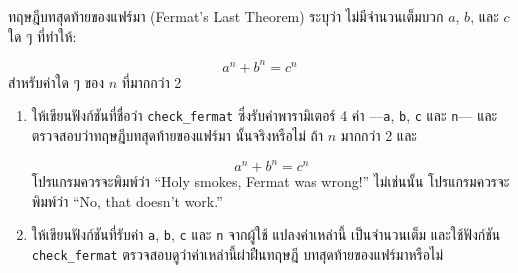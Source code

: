 \begin{exercise}

ทฤษฎีบทสุดท้ายของแฟร์มา (Fermat's Last Theorem) ระบุว่า ไม่มีจำนวนเต็มบวก
$a$, $b$, และ $c$ ใด ๆ ที่ทำให้: 

\[ a^n + b^n = c^n \]
%
สำหรับค่าใด ๆ ของ $n$ ที่มากกว่า 2

\begin{enumerate}

\item ให้เขียนฟังก์ชันที่ชื่อว่า \verb"check_fermat" ซึ่งรับค่าพารามิเตอร์ 4 ค่า
---{\tt a}, {\tt b}, {\tt c} และ {\tt n}--- และตรวจสอบว่าทฤษฎีบทสุดท้ายของแฟร์มา
นั้นจริงหรือไม่ ถ้า $n$ มากกว่า 2 และ

\[a^n + b^n = c^n \]
%
โปรแกรมควรจะพิมพ์ว่า ``Holy smokes, Fermat was wrong!''
ไม่เช่นนั้น โปรแกรมควรจะพิมพ์ว่า ``No, that doesn't work.''

\item ให้เขียนฟังก์ชันที่รับค่า {\tt a}, {\tt b}, {\tt c} และ {\tt n} จากผู้ใช้ แปลงค่าเหล่านี้
เป็นจำนวนเต็ม และใช้ฟังก์ชัน \verb"check_fermat" ตรวจสอบดูว่าค่าเหล่านี้ผ่าฝืนทฤษฎี
บทสุดท้ายของแฟร์มาหรือไม่

\end{enumerate}

\end{exercise}


